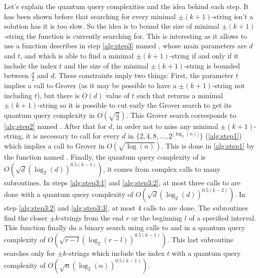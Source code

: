 \begin{itemize}
          Let's explain the quantum query complexities and the idea behind
          each step. It has been shown before that searching for every minimal $\pm(k+1)$-string isn't a solution has it is too slow. So the idea
          is to bound the size of minimal $\pm(k+1)$-string the function is currently searching for. This is interesting
          as it allows to use a function describes in step \ref{alg:step3} named , whose main parameters are $d$ and $t$, and which is able to
          find a minimal $\pm(k+1)$-string if and only if it include the index $t$ and the size of the minimal $\pm(k+1)$-string
          is bounded between $\frac{d}{2}$ and $d$. These constraints imply two things:
          First, the parameter $t$ implies a call to Grover (as it may be possible to have a $\pm(k+1)$-string  not including $t$), but
          there is $O(d)$ value of $t$ such that  returns a minimal $\pm(k+1)$-string so it is possible
          to cut early the Grover search to get its quantum query complexity in $O\left(\sqrt{\frac{n}{d}}\right)$.
          This Grover search corresponds to \autoref{alg:step2} named .
          After that for $d$, in order not to miss any minimal $\pm(k+1)$-string, it is necessary to call 
          for every $d$ in $\{2, 4, 8, \ldots, 2^{\lfloor \log_2(n) \rfloor}\}$ (\autoref{alg:step1}) which implies a
          call to Grover in $O\left(\sqrt{\log(n)}\right)$. This is done in \autoref{alg:step1} by the function named
          .
          Finally, the quantum query complexity of  is $O\left(\sqrt{d}(\log_2(d))^{0.5(k-1)}\right)$, it comes from
          complex calls to many subroutines. In steps \ref{alg:step3:1} and \ref{alg:step3:2}, at most
          three calls to  are done with a quantum query complexity of $O\left(\sqrt{d}(\log_2(d))^{0.5(k-2)}\right)$.
          In step \ref{alg:step3:2} and \ref{alg:step3:3}, at most 4 calls to  are done. The
          subroutines  find the closer $\pm k$-strings from the end $r$ or the beginning $l$ of a
          specified interval. This function finally do a binary search using calls to 
          and  in a quantum query complexity of $O\left(\sqrt{r-l}(\log_2(r-l))^{0.5(k-1)}\right)$.
          This last subroutine  searches only for $\pm k$-strings which include the index $t$
          with a quantum query complexity of $O\left(\sqrt{n}(\log_2(n))^{0.5(k-1)}\right)$.

          \begin{figure}[h!]
              \centering
\end{figure}
\end{itemize}
